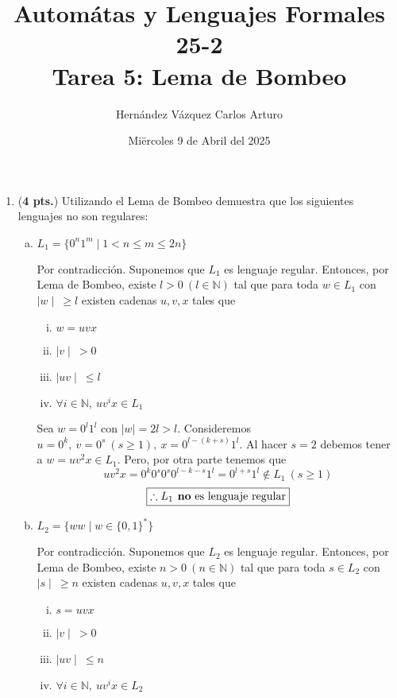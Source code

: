 \documentclass{article}
\title{Automátas y Lenguajes Formales 25-2 \\ Tarea 5: Lema de Bombeo}
\author{Hernández Vázquez Carlos Arturo }
\date{Miërcoles 9 de Abril del 2025}
\begin{document}
\maketitle

\begin{enumerate}
  \item (\textbf{4 pts.}) Utilizando el Lema de Bombeo demuestra que los siguientes lenguajes no son regulares:
    \begin{enumerate}[a)]
        \item $L_1 = \{0^n1^m \mid 1 < n \leq m \leq 2n\}$

          Por contradicción. Suponemos que $L_1$ es lenguaje regular. Entonces, por Lema de Bombeo, existe $l > 0~(l \in \mathbb{N})$ tal que para toda $w \in L_1$ con $\mid w \mid ~ \ge l$ existen cadenas $u,v,x$ tales que
          \begin{enumerate}[i)]
            \item $w = uvx$
            \item $\mid v \mid ~ > 0$
            \item $\mid uv \mid ~ \le l$
            \item $\forall i \in \mathbb N, ~ uv^ix \in L_1$
          \end{enumerate}

          Sea $w = 0^l1^l$ con $\mid w \mid = 2l > l$. Consideremos $u = 0^k, ~ v = 0^s ~(s \ge 1),~ x = 0^{l - (k + s)}1^l$. 
          Al hacer $s = 2$ debemos tener a $w = uv^2x \in L_1$. Pero, por otra parte tenemos que
          $$uv^2x= 0^k0^s0^s0^{l - k - s}1^l = 0^{l + s} 1^l \notin L_1 ~(s \ge 1)$$
          $$\boxed{\therefore L_1 \text{\textbf{ no} es lenguaje regular}}$$
        \item $L_2 = \{ ww \mid w \in \{0,1\}^* \}$

          Por contradicción. Suponemos que $L_2$ es lenguaje regular. Entonces, por Lema de Bombeo, existe $n > 0~(n \in \mathbb{N})$ tal que para toda $s \in L_2$ con $\mid s \mid ~ \ge n$ existen cadenas $u,v,x$ tales que
          \begin{enumerate}[i)]
            \item $s = uvx$
            \item $\mid v \mid ~ > 0$
            \item $\mid uv \mid ~ \le n$
            \item $\forall i \in \mathbb N, ~ uv^ix \in L_2$
          \end{enumerate}


\end{enumerate}
\end{enumerate}
\end{document}
